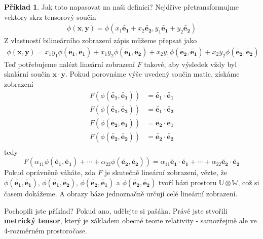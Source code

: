 \documentclass[a5paper,12pt]{amsbook}
\theoremstyle{definition}
\newtheorem{example}{Příklad}[chapter]
\newcommand{\myvec}[1]{\mathbf{#1}}
\newcommand{\myspace}[1]{\mathbb{#1}}
\begin{document}
\begin{example}
Jak toto napasovat na naši definici? Nejdříve přetransformujme vektory skrz tensorový součin
\begin{equation*}
\begin{split}
\phi(\myvec{x}, \myvec{y}) = \phi(x_1\myvec{\widetilde{e_1}} + x_2\myvec{\widetilde{e_2}},
  y_1\myvec{\widetilde{e_1}} + y_2\myvec{\widetilde{e_2}})
\end{split}
\end{equation*}
Z vlastností bilineárního zobrazení zápis můžeme přepsat jako
\begin{equation*}
\begin{split}
\phi(\myvec{x}, \myvec{y}) =
  x_1 y_1 \phi(\myvec{\widetilde{e_1}}, \myvec{\widetilde{e_1}})
  + x_1 y_2 \phi(\myvec{\widetilde{e_1}}, \myvec{\widetilde{e_2}})
  + x_2 y_1 \phi(\myvec{\widetilde{e_2}}, \myvec{\widetilde{e_1}})
  + x_2 y_2 \phi(\myvec{\widetilde{e_2}}, \myvec{\widetilde{e_2}})
\end{split}
\end{equation*}
Teď potřebujeme nalézt lineární zobrazení $F$ takové, aby výsledek vždy byl skalární
součin $\myvec{x}\cdot\myvec{y}$. Pokud porovnáme výše uvedený součin matic, získáme
zobrazení
\begin{equation*}
\begin{split}
F(\phi(\myvec{\widetilde{e_1}}, \myvec{\widetilde{e_1}})) &=
    \myvec{\widetilde{e_1}}\cdot\myvec{\widetilde{e_1}} \\
F(\phi(\myvec{\widetilde{e_1}}, \myvec{\widetilde{e_2}})) &=
    \myvec{\widetilde{e_1}}\cdot\myvec{\widetilde{e_2}} \\
F(\phi(\myvec{\widetilde{e_2}}, \myvec{\widetilde{e_1}})) &=
    \myvec{\widetilde{e_2}}\cdot\myvec{\widetilde{e_1}} \\
F(\phi(\myvec{\widetilde{e_2}}, \myvec{\widetilde{e_2}})) &=
    \myvec{\widetilde{e_2}}\cdot\myvec{\widetilde{e_2}} \\
\end{split}
\end{equation*}
tedy
\begin{equation*}
F(\alpha_{11}\phi(\myvec{\widetilde{e_1}}, \myvec{\widetilde{e_1}}) + \cdots 
  + \alpha_{22}\phi(\myvec{\widetilde{e_2}}, \myvec{\widetilde{e_2}})) 
= \alpha_{11}\myvec{\widetilde{e_1}}\cdot\myvec{\widetilde{e_1}} + \cdots
  + \alpha_{22}\myvec{\widetilde{e_2}}\cdot\myvec{\widetilde{e_2}}
\end{equation*}
Pokud oprávněně váháte, zda $F$ je skutečně lineární zobrazení, vězte, že
$\phi(\myvec{\widetilde{e_1}}, \myvec{\widetilde{e_1}})$, 
$\phi(\myvec{\widetilde{e_1}}, \myvec{\widetilde{e_2}})$,
$\phi(\myvec{\widetilde{e_2}}, \myvec{\widetilde{e_1}})$ a
$\phi(\myvec{\widetilde{e_2}}, \myvec{\widetilde{e_2}})$ tvoří bázi prostoru
$\myspace{U}\otimes\myspace{W}$, což si časem dokážeme. A obrazy báze jednoznačně
určují celé lineární zobrazení.

\medskip\noindent
Pochopili jste příklad? Pokud ano, udělejte si pašáka. Právě jste stvořili
\textbf{metrický tensor}, který je základem obecné teorie relativity - samozřejmě
ale ve 4-rozměrném prostoročase.
\end{example}
\end{document}
